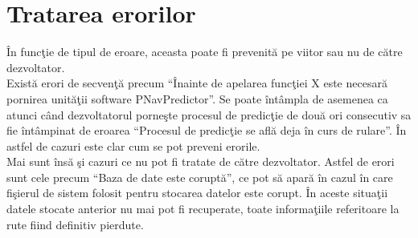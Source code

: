 	
\section{Tratarea erorilor}
În funcţie de tipul de eroare, aceasta poate fi prevenită pe viitor sau nu de către dezvoltator.
\vspace{6pt}
\\Există erori de secvenţă precum ``Înainte de apelarea funcţiei X este necesară pornirea unităţii software PNavPredictor''. Se poate întâmpla de asemenea ca atunci când dezvoltatorul porneşte procesul de predicţie de două ori consecutiv sa fie întâmpinat de eroarea ``Procesul de predicţie se află deja în curs de rulare''.
În astfel de cazuri este clar cum se pot preveni erorile.
\vspace{6pt}
\\Mai sunt însă şi cazuri ce nu pot fi tratate de către dezvoltator. Astfel de erori sunt cele precum ``Baza de date este coruptă'', ce pot să apară în cazul în care fişierul de sistem folosit pentru stocarea datelor este corupt. În aceste situaţii datele stocate anterior nu mai pot fi recuperate, toate informaţiile referitoare la rute fiind definitiv pierdute.




